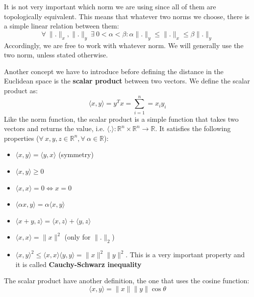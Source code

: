 \par It is not very important which norm we are using since all of them are topologically equivalent. This means that whatever two norms we choose, there is a simple linear relation between them:
\begin{equation}
    \forall\ \lVert . \rVert_x, \lVert . \rVert_y\ \exists\ 0 < \alpha < \beta : \alpha \lVert . \rVert_y \leq \lVert . \rVert_x \leq \beta \lVert . \rVert_y
    \label{eq:norm_equivalence}
\end{equation}
Accordingly, we are free to work with whatever norm. We will generally use the two norm, unless stated otherwise.
\par Another concept we have to introduce before defining the distance in the Euclidean space is the \textbf{scalar product} between two vectors. We define the scalar product as:
\begin{equation}
    \langle x,y \rangle = y^{T}x = \sum_{i=1}^n = x_i y_i
    \label{eq:scalar_product}
\end{equation}
Like the norm function, the scalar product is a simple function that takes two vectors and returns the value, i.e. $\langle.\rangle : \mathbb{R}^n \times \mathbb{R}^n \rightarrow \mathbb{R}$. It satisfies the following properties ($\forall\ x,y,z \in \mathbb{R}^n, \forall\ \alpha \in \mathbb{R}$):
\begin{itemize}
    \item $\langle x, y \rangle = \langle y, x \rangle$ (symmetry)
    \item $\langle x, y \rangle \geq 0$
    \item $\langle x, x \rangle = 0 \iff x = 0$
    \item $\langle \alpha x, y \rangle = \alpha \langle x, y \rangle$
    \item $\langle x + y, z \rangle = \langle x, z \rangle + \langle y, z \rangle$
    \item $\langle x, x \rangle = \lVert x \rVert^2$ (only for $\lVert . \rVert_2$)
    \item $\langle x, y \rangle^2 \leq \langle x, x \rangle \langle y, y \rangle = \lVert x \rVert^2 \lVert y \rVert^2$. This is a very important property and it is called \textbf{Cauchy-Schwarz inequality}
\end{itemize}
The scalar product have another definition, the one that uses the cosine function:
\begin{equation}
    \langle x,y \rangle = \lVert x \rVert \lVert y \rVert \cos \theta
    \label{eq:scalar_product_cos}
\end{equation}
